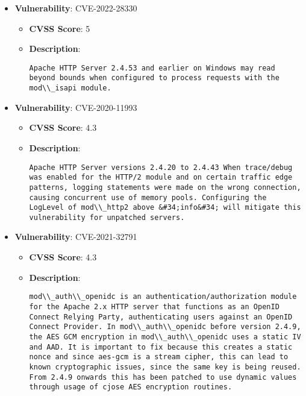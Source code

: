 \documentclass{article}
\begin{document}
\begin{itemize}
        \item \textbf{Vulnerability}: CVE-2022-28330
        \begin{itemize}
            \item \textbf{CVSS Score}:  5 
            \item \textbf{Description}:
            \parbox[t]{0.9\linewidth}{
                \verb|Apache HTTP Server 2.4.53 and earlier on Windows may read beyond bounds when configured to process requests with the mod\\_isapi module.|
            }
        \end{itemize}
    
        \item \textbf{Vulnerability}: CVE-2020-11993
        \begin{itemize}
            \item \textbf{CVSS Score}:  4.3 
            \item \textbf{Description}:
            \parbox[t]{0.9\linewidth}{
                \verb|Apache HTTP Server versions 2.4.20 to 2.4.43 When trace/debug was enabled for the HTTP/2 module and on certain traffic edge patterns, logging statements were made on the wrong connection, causing concurrent use of memory pools. Configuring the LogLevel of mod\\_http2 above &#34;info&#34; will mitigate this vulnerability for unpatched servers.|
            }
        \end{itemize}
    
        \item \textbf{Vulnerability}: CVE-2021-32791
        \begin{itemize}
            \item \textbf{CVSS Score}:  4.3 
            \item \textbf{Description}:
            \parbox[t]{0.9\linewidth}{
                \verb|mod\\_auth\\_openidc is an authentication/authorization module for the Apache 2.x HTTP server that functions as an OpenID Connect Relying Party, authenticating users against an OpenID Connect Provider. In mod\\_auth\\_openidc before version 2.4.9, the AES GCM encryption in mod\\_auth\\_openidc uses a static IV and AAD. It is important to fix because this creates a static nonce and since aes-gcm is a stream cipher, this can lead to known cryptographic issues, since the same key is being reused. From 2.4.9 onwards this has been patched to use dynamic values through usage of cjose AES encryption routines.|
            }
        \end{itemize}
    

\end{itemize}
\end{document}
